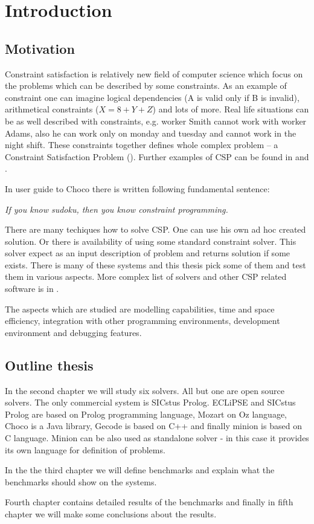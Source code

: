 \chapter{Introduction}
\thispagestyle{myheadings}

\section{Motivation}
Constraint satisfaction is relatively new field of computer science which focus on the problems
which can be described by some constraints. As an example of constraint one can imagine logical dependencies 
(A is valid only if B is invalid), arithmetical constraints ($X = 8 + Y + Z$) and lots of more. Real life situations can 
be as well described with constraints, e.g. worker Smith cannot work with worker Adams, also he can work only 
on monday and tuesday and cannot work in the night shift. These constraints together defines whole
complex problem -- a Constraint Satisfaction Problem ().
Further examples of CSP can be found in \cite{csplib} and \cite{Apt2003}.

In user guide to Choco there is written following fundamental sentence:

\begin{center}
\em If you know sudoku, then you know constraint programming.
\end{center}

There are many techiques how to solve CSP. One can use his own ad hoc created solution. 
Or there is availability of using some standard constraint solver. This solver expect
as an input description of problem and returns solution if some exists. There is many 
of these systems and this thesis pick some of them and test them in various aspects.
More complex list of solvers and other CSP related software is in \cite{bartak:los}.

The aspects which are studied are modelling capabilities, time and space efficiency, 
integration with other programming environments, development environment and debugging features. 

\section{Outline thesis}

In the second chapter we will study six solvers. All but one are open source solvers. 
The only commercial system is SICstus Prolog. ECLiPSE and SICstus Prolog are based on Prolog
programming language, Mozart on Oz language, Choco is a Java library, Gecode is based on C++ and finally 
minion is based on C language. Minion can be also used as standalone solver - in this 
case it provides its own language for definition of problems.

In the the third chapter we will define benchmarks and explain what the benchmarks
should show on the systems.

Fourth chapter contains detailed results of the benchmarks and finally in fifth chapter 
we will make some conclusions about the results.
